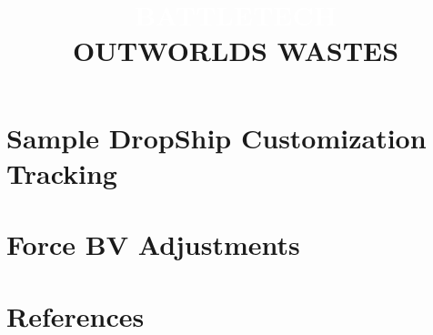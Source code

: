 \documentclass{article}
\begin{document}


\newpage

\section{Sample DropShip Customization Tracking}



\newpage

\section{Force BV Adjustments}
\label{sec:force_bv_adjustments}



\newpage

\section{References}
\label{sec:references}



\newpage


\clearpage

\setlength{\headsep}{25pt}

\title{
  \selectfont
  \vspace{6px}
  \fontsize{50}{60}\selectfont\textcolor{white}{\MakeUppercase{B}}\fontsize{45}{55}\selectfont\textcolor{white}{\MakeUppercase{attle}}\fontsize{50}{60}\selectfont\textcolor{white}{\MakeUppercase{T}}\fontsize{45}{55}\selectfont\textcolor{white}{\MakeUppercase{ech}}\\
  \fontsize{35}{42}\selectfont\MakeUppercase{Outworlds Wastes}
}
\end{document}
